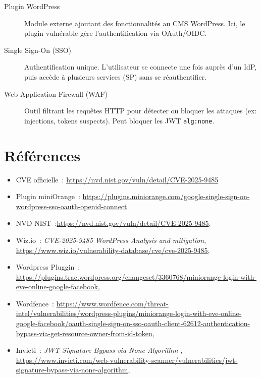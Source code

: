 \documentclass[a4paper,12pt]{article}
\begin{document}
\begin{description}
  \item[Plugin WordPress] Module externe ajoutant des fonctionnalités au CMS WordPress. Ici, le plugin vulnérable gère l’authentification via OAuth/OIDC.

  \item[Single Sign-On (SSO)] Authentification unique. L’utilisateur se connecte une fois auprès d’un IdP, puis accède à plusieurs services (SP) sans se réauthentifier.

  \item[Web Application Firewall (WAF)] Outil filtrant les requêtes HTTP pour détecter ou bloquer les attaques (ex: injections, tokens suspects). Peut bloquer les JWT \texttt{alg:none}.
\end{description}


\section{Références}
\begin{itemize}
  \item CVE officielle~: \url{https://nvd.nist.gov/vuln/detail/CVE-2025-9485}
  \item Plugin miniOrange~: \url{https://plugins.miniorange.com/google-single-sign-on-wordpress-sso-oauth-openid-connect}
  \item NVD NIST~:\url{https://nvd.nist.gov/vuln/detail/CVE-2025-9485},
  \item Wiz.io~: \textit{CVE-2025-9485 WordPress Analysis and mitigation}, \url{https://www.wiz.io/vulnerability-database/cve/cve-2025-9485},
  \item Wordpress Pluggin~: \url{https://plugins.trac.wordpress.org/changeset/3360768/miniorange-login-with-eve-online-google-facebook},
  \item Wordfence~: \url{https://www.wordfence.com/threat-intel/vulnerabilities/wordpress-plugins/miniorange-login-with-eve-online-google-facebook/oauth-single-sign-on-sso-oauth-client-62612-authentication-bypass-via-get-resource-owner-from-id-token},
  \item Invicti~: \textit{JWT Signature Bypass via None Algorithm
}, \url{https://www.invicti.com/web-vulnerability-scanner/vulnerabilities/jwt-signature-bypass-via-none-algorithm},
\end{itemize}
\end{document}
